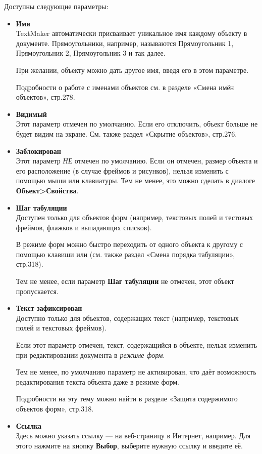 \documentclass[a4paper,10pt]{article}
\begin{document}
Доступны следующие параметры:
\begin{itemize}
 \item \textbf{Имя}\\
TextMaker автоматически присваивает уникальное имя каждому объекту в документе. Прямоугольники, например, называются Прямоугольник 1,  Прямоугольник 2, Прямоугольник 3 и так далее.

При желании, объекту можно дать другое имя, введя его в этом параметре.

Подробности о работе с именами объектов см. в разделе «Смена имён объектов», стр.278.
\item \textbf{Видимый}\\
Этот параметр отмечен по умолчанию. Если его отключить, объект больше не будет видим на экране. См. также раздел «Скрытие объектов», стр.276.
\item \textbf{Заблокирован}\\
Этот параметр \textit{НЕ} отмечен по умолчанию. Если он отмечен, размер объекта и его расположение (в случае фреймов и рисунков), нельзя изменить с помощью мыши или клавиатуры. Тем не менее, это можно сделать в диалоге \textbf{Объект>Свойства}.
\item \textbf{Шаг табуляции}\\
Доступен только для объектов форм (например, текстовых полей и тестовых фреймов, флажков и выпадающих списков).

В режиме форм можно быстро переходить от одного объекта к другому с помощью клавиши  или  (см. также раздел «Смена порядка табуляции», стр.318).

Тем не менее, если параметр \textbf{Шаг табуляции} не отмечен, этот объект пропускается.

\item \textbf{Текст зафиксирован}\\
Доступно только для объектов, содержащих текст (например, текстовых полей и текстовых фреймов).

Если этот параметр отмечен, текст, содержащийся в объекте, нельзя изменить при редактировании документа в \textit{режиме форм}.

Тем не менее, по умолчанию параметр не активирован, что даёт возможность редактирования текста объекта даже в режиме форм.

Подробности на эту тему можно найти в разделе «Защита содержимого объектов форм», стр.318.
\item \textbf{Ссылка}\\
Здесь можно указать ссылку --- на веб-страницу в Интернет, например. Для этого нажмите на кнопку \textbf{Выбор}, выберите нужную ссылку и введите её.
\end{itemize}
\end{document}
